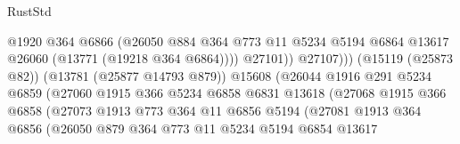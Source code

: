 \begin{lexlean}{RustStd}
\begin{coremodule}
                                            @1920
                                            @364
                                            @6866
                                            (@26050
                                              @884
                                              @364
                                              @773
                                              @11
                                              @5234
                                              @5194
                                              @6864
                                              @13617
                                              @26060
                                              (@13771 (@19218 @364 @6864))))
                                          @27101))
                                      @27107)))
                                (@15119 (@25873 @82))
                                (@13781 (@25877 @14793 @879))
                                @15608
                                (@26044
                                  @1916
                                  @291
                                  @5234
                                  @6859
                                  (@27060
                                    @1915
                                    @366
                                    @5234
                                    @6858
                                    @6831
                                    @13618
                                    (@27068
                                      @1915
                                      @366
                                      @6858
                                      (@27073
                                        @1913
                                        @773
                                        @364
                                        @11
                                        @6856
                                        @5194
                                        (@27081
                                          @1913
                                          @364
                                          @6856
                                          (@26050
                                            @879
                                            @364
                                            @773
                                            @11
                                            @5234
                                            @5194
                                            @6854
                                            @13617

\end{coremodule}
\end{lexlean}
